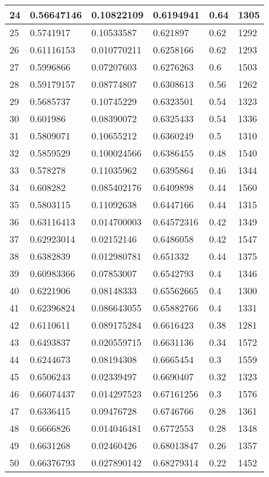 \begin{longtable}{|l|l|l|l|l|l|}
24 & 0.56647146 & 0.10822109 & 0.6194941 & 0.64 & 1305 \\ \hline 
25 & 0.5741917 & 0.10533587 & 0.621897 & 0.62 & 1292 \\ \hline 
26 & 0.61116153 & 0.010770211 & 0.6258166 & 0.62 & 1293 \\ \hline 
27 & 0.5996866 & 0.07207603 & 0.6276263 & 0.6 & 1503 \\ \hline 
28 & 0.59179157 & 0.08774807 & 0.6308613 & 0.56 & 1262 \\ \hline 
29 & 0.5685737 & 0.10745229 & 0.6323501 & 0.54 & 1323 \\ \hline 
30 & 0.601986 & 0.08390072 & 0.6325433 & 0.54 & 1336 \\ \hline 
31 & 0.5809071 & 0.10655212 & 0.6360249 & 0.5 & 1310 \\ \hline 
32 & 0.5859529 & 0.100024566 & 0.6386455 & 0.48 & 1540 \\ \hline 
33 & 0.578278 & 0.11035962 & 0.6395864 & 0.46 & 1344 \\ \hline 
34 & 0.608282 & 0.085402176 & 0.6409898 & 0.44 & 1560 \\ \hline 
35 & 0.5803115 & 0.11092638 & 0.6447166 & 0.44 & 1315 \\ \hline 
36 & 0.63116413 & 0.014700003 & 0.64572316 & 0.42 & 1349 \\ \hline 
37 & 0.62923014 & 0.02152146 & 0.6486058 & 0.42 & 1547 \\ \hline 
38 & 0.6382839 & 0.012980781 & 0.651332 & 0.44 & 1375 \\ \hline 
39 & 0.60983366 & 0.07853007 & 0.6542793 & 0.4 & 1346 \\ \hline 
40 & 0.6221906 & 0.08148333 & 0.65562665 & 0.4 & 1300 \\ \hline 
41 & 0.62396824 & 0.086643055 & 0.65882766 & 0.4 & 1331 \\ \hline 
42 & 0.6110611 & 0.089175284 & 0.6616423 & 0.38 & 1281 \\ \hline 
43 & 0.6493837 & 0.020559715 & 0.6631136 & 0.34 & 1572 \\ \hline 
44 & 0.6244673 & 0.08194308 & 0.6665454 & 0.3 & 1559 \\ \hline 
45 & 0.6506243 & 0.02339497 & 0.6690407 & 0.32 & 1323 \\ \hline 
46 & 0.66074437 & 0.014297523 & 0.67161256 & 0.3 & 1576 \\ \hline 
47 & 0.6336415 & 0.09476728 & 0.6746766 & 0.28 & 1361 \\ \hline 
48 & 0.6666826 & 0.014046481 & 0.6772553 & 0.28 & 1348 \\ \hline 
49 & 0.6631268 & 0.02460426 & 0.68013847 & 0.26 & 1357 \\ \hline 
50 & 0.66376793 & 0.027890142 & 0.68279314 & 0.22 & 1452 \\ \hline 
\end{longtable}